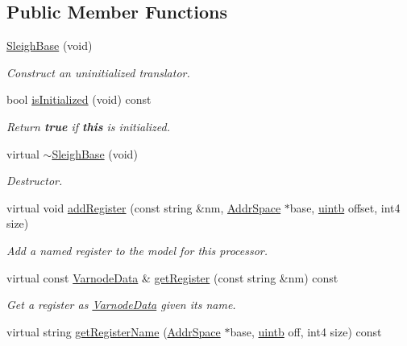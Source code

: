 \subsection*{Public Member Functions}
\begin{DoxyCompactItemize}
\item 
\mbox{\hyperlink{class_sleigh_base_af8e1d433a766cd09a21ad106f6428b11}{Sleigh\+Base}} (void)
\begin{DoxyCompactList}\small\item\em Construct an uninitialized translator. \end{DoxyCompactList}\item 
bool \mbox{\hyperlink{class_sleigh_base_a20fd6cc75489602f9dbb0cd272a7832c}{is\+Initialized}} (void) const
\begin{DoxyCompactList}\small\item\em Return {\bfseries{true}} if {\bfseries{this}} is initialized. \end{DoxyCompactList}\item 
virtual \mbox{\hyperlink{class_sleigh_base_a61f8edca04aa8f77e8d3d8e18ca95e2c}{$\sim$\+Sleigh\+Base}} (void)
\begin{DoxyCompactList}\small\item\em Destructor. \end{DoxyCompactList}\item 
virtual void \mbox{\hyperlink{class_sleigh_base_ae0605dc3af75f3227793c7dfddb8c9f9}{add\+Register}} (const string \&nm, \mbox{\hyperlink{class_addr_space}{Addr\+Space}} $\ast$base, \mbox{\hyperlink{types_8h_a2db313c5d32a12b01d26ac9b3bca178f}{uintb}} offset, int4 size)
\begin{DoxyCompactList}\small\item\em Add a named register to the model for this processor. \end{DoxyCompactList}\item 
virtual const \mbox{\hyperlink{struct_varnode_data}{Varnode\+Data}} \& \mbox{\hyperlink{class_sleigh_base_ad347067ddd9469322e79b97a19386f82}{get\+Register}} (const string \&nm) const
\begin{DoxyCompactList}\small\item\em Get a register as \mbox{\hyperlink{struct_varnode_data}{Varnode\+Data}} given its name. \end{DoxyCompactList}\item 
virtual string \mbox{\hyperlink{class_sleigh_base_a76bd4052e92fd37b38c49768e4020652}{get\+Register\+Name}} (\mbox{\hyperlink{class_addr_space}{Addr\+Space}} $\ast$base, \mbox{\hyperlink{types_8h_a2db313c5d32a12b01d26ac9b3bca178f}{uintb}} off, int4 size) const

\end{DoxyCompactItemize}

